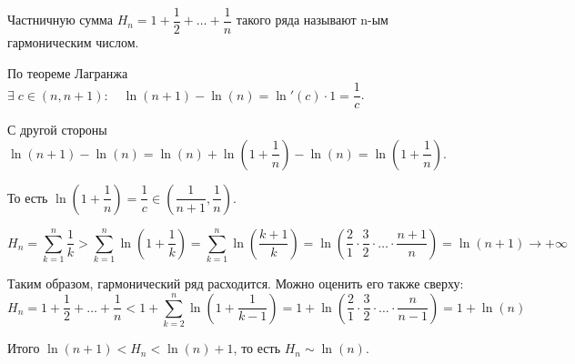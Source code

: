 \documentclass[../main.tex]{subfiles}
\begin{document}
\begin{example}
\begin{enumerate}
        Частничную сумма \( H_n=1+ \dfrac{ 1}{ 2} + \ldots + \dfrac{ 1}{ n} \) такого ряда называют n-ым гармоническим числом. \par 
        По теореме Лагранжа \( \exists \; c \in \left( n, n+1\right):\quad \ln \left( n+1\right)- \ln \left( n\right)= \ln '\left( c\right) \cdot1= \dfrac{ 1}{ c} \). \par 
        С другой стороны \( \ln \left( n+1\right)- \ln \left( n\right)= \ln \left( n\right) + \ln \left( 1+ \dfrac{ 1}{ n} \right)- \ln \left( n\right)= \ln \left( 1 + \dfrac{ 1}{ n} \right)\). \par 
        То есть \( \ln \left( 1 + \dfrac{ 1}{ n} \right) = \dfrac{ 1}{ c} \in \left( \dfrac{ 1}{ n+1} , \dfrac{ 1}{ n} \right)\). \par 
        \[ H_n = \sum\limits_{ k=1}^{ n} \dfrac{ 1}{ k} > \sum\limits_{ k=1}^{ n} \ln \left( 1+ \dfrac{ 1}{ k} \right)= \sum\limits_{ k=1}^{ n} \ln \left( \dfrac{ k+1}{ k} \right)= \ln \left( \dfrac{ 2}{ 1} \cdot \dfrac{ 3}{ 2} \cdot \ldots \cdot \dfrac{ n+1}{ n} \right)= \ln \left( n+1\right) \longrightarrow +\infty \]
        \par Таким образом, гармонический ряд расходится. Можно оценить его также сверху:
        \[ H_n= 1 + \dfrac{ 1}{ 2} + \ldots + \dfrac{ 1}{ n} < 1 + \sum\limits_{ k=2}^{ n} \ln \left( 1+ \dfrac{ 1}{ k-1} \right)=1 + \ln \left( \dfrac{ 2}{ 1} \cdot \dfrac{ 3}{ 2} \cdot \ldots \cdot \dfrac{ n}{ n-1} \right)=1+ \ln \left( n\right)\]
        \par Итого \( \ln \left( n+1\right)< H_n< \ln \left( n\right)+1\), то есть \( H_n \sim \ln \left( n\right)\).
    \end{enumerate}
\end{example}
\end{document}
